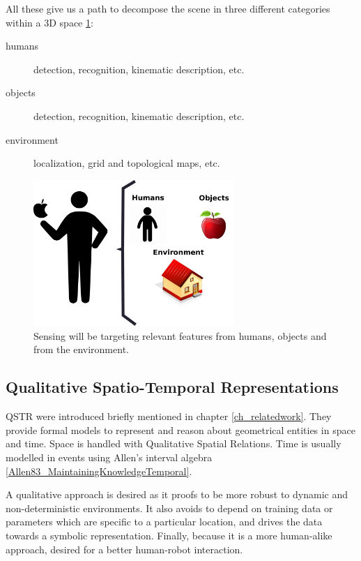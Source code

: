 All these give us a path to decompose the scene in three different categories within a 3D space \ref{fig:decomposition}: 
\begin{description}
\item[humans] detection, recognition, kinematic description, etc.
\item[objects] detection, recognition, kinematic description, etc.
\item[environment] localization, grid and topological maps, etc.
\end{description}

\begin{figure}[h]
\centering
\includegraphics[width=3in]{fig/scene_dec.pdf}
\caption{Sensing will be targeting relevant features from humans, objects and from the environment.}
\label{fig:decomposition}
\end{figure}


\subsection{Qualitative Spatio-Temporal Representations}
QSTR were introduced briefly mentioned in chapter \ref{ch_relatedwork}.
They provide formal models to represent and reason about geometrical entities in space and time.
Space is handled with Qualitative Spatial Relations. %
Time is usually modelled in events using Allen's interval algebra \ref{Allen83_MaintainingKnowledgeTemporal}. %

A qualitative approach is desired as it proofs to be more robust to dynamic and non-deterministic environments.
It also avoids to depend on training data or parameters which are specific to a particular location, and drives the data towards a symbolic representation.
Finally, because it is a more human-alike approach, desired for a better human-robot interaction.


